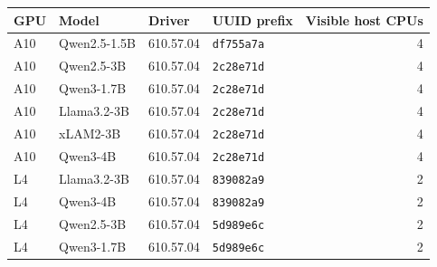 \begin{tabular}{llllr}
\toprule
GPU & Model & Driver & UUID prefix & Visible host CPUs \\
\midrule
A10 & Qwen2.5-1.5B & 610.57.04 & \texttt{df755a7a} & 4 \\
A10 & Qwen2.5-3B & 610.57.04 & \texttt{2c28e71d} & 4 \\
A10 & Qwen3-1.7B & 610.57.04 & \texttt{2c28e71d} & 4 \\
A10 & Llama3.2-3B & 610.57.04 & \texttt{2c28e71d} & 4 \\
A10 & xLAM2-3B & 610.57.04 & \texttt{2c28e71d} & 4 \\
A10 & Qwen3-4B & 610.57.04 & \texttt{2c28e71d} & 4 \\
L4 & Llama3.2-3B & 610.57.04 & \texttt{839082a9} & 2 \\
L4 & Qwen3-4B & 610.57.04 & \texttt{839082a9} & 2 \\
L4 & Qwen2.5-3B & 610.57.04 & \texttt{5d989e6c} & 2 \\
L4 & Qwen3-1.7B & 610.57.04 & \texttt{5d989e6c} & 2 \\
\bottomrule
\end{tabular}
